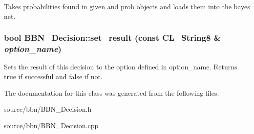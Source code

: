 \label{classBBN__Decision_a1a4ff92ffa1b4c3abba092b07d6f9b93}
Takes probabilities found in given and prob objects and loads them into the bayes net. \hypertarget{classBBN__Decision_a3684f85ac9f3047bbd3ef57b1eaf7e3d}{
\subsubsection[{set\_\-result}]{\setlength{\rightskip}{0pt plus 5cm}bool BBN\_\-Decision::set\_\-result (const CL\_\-String8 \& {\em option\_\-name})}}
\label{classBBN__Decision_a3684f85ac9f3047bbd3ef57b1eaf7e3d}
Sets the result of this decision to the option defined in option\_\-name. Returns true if successful and false if not. 

The documentation for this class was generated from the following files:\begin{DoxyCompactItemize}
\item 
source/bbn/BBN\_\-Decision.h\item 
source/bbn/BBN\_\-Decision.cpp\end{DoxyCompactItemize}
